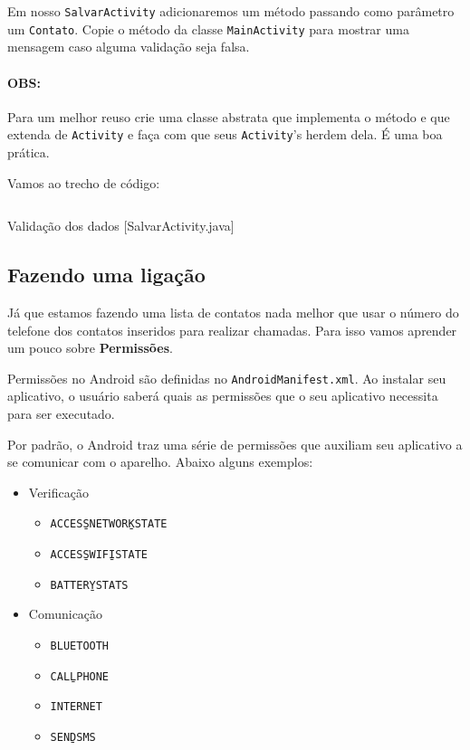 Em nosso \texttt{SalvarActivity} adicionaremos um método  passando como parâmetro
um \texttt{Contato}. Copie o método  da classe \texttt{MainActivity} para
mostrar uma mensagem caso alguma validação seja falsa.

\paragraph{OBS:} Para um melhor reuso crie uma classe abstrata que implementa o método 
e que extenda de \texttt{Activity} e faça com que seus \texttt{Activity}'s herdem dela. É uma boa
prática.

Vamos ao trecho de código:

\begin{listing}[H]
  \inputminted[linenos=true,frame=bottomline,tabsize=3]{ java }{ source/SalvarActivity-4.java }
  \caption{Validação dos dados [SalvarActivity.java]}
\end{listing}

\subsection{Fazendo uma ligação}

Já que estamos fazendo uma lista de contatos nada melhor que usar o número do telefone dos
contatos inseridos para realizar chamadas. Para isso vamos aprender um pouco sobre \textbf{Permissões}.

Permissões no Android são definidas no \texttt{AndroidManifest.xml}. Ao instalar seu aplicativo,
o usuário saberá quais as permissões que o seu aplicativo necessita para ser executado.

Por padrão, o Android traz uma série de permissões que auxiliam seu aplicativo a se comunicar com
o aparelho. Abaixo alguns exemplos:

\begin{itemize}
\item Verificação
\begin{itemize}
  \item \texttt{ACCESS\b{ }NETWORK\b{ }STATE}
  \item \texttt{ACCESS\b{ }WIFI\b{ }STATE}
  \item \texttt{BATTERY\b{ }STATS}
\end{itemize}

\item Comunicação
\begin{itemize}
  \item \texttt{BLUETOOTH}
  \item \texttt{CALL\b{ }PHONE}
  \item \texttt{INTERNET}
  \item \texttt{SEND\b{ }SMS}
\end{itemize}

\end{itemize}

